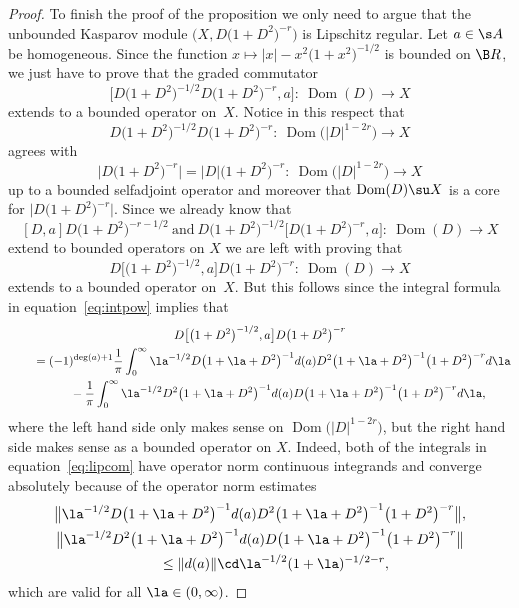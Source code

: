 \begin{proof}
To finish the proof of the proposition we only need to argue that the unbounded Kasparov module $\big(X,D\big(1 + D^2\big)^{-r}\big)$ is Lipschitz regular. Let $a \in \s A$ be homogeneous. Since the function $x \mapsto |x| - x^2 \big(1 + x^2\big)^{-1/2}$ is bounded on $\B R$, we just have to prove that the graded commutator
\[
\big[ D\big(1 + D^2\big)^{-1/2} D\big(1 + D^2\big)^{-r}, a \big]\colon \ \operatorname{Dom}(D) \to X
\]
extends to a bounded operator on~$X$. Notice in this respect that
\[ D\big(1 + D^2\big)^{-1/2} D\big(1 + D^2\big)^{-r}\colon \ \operatorname{Dom}\big(|D|^{1 - 2r}\big) \to X\] agrees with
\[ \big|D\big(1 + D^2\big)^{-r}\big| = |D|\big(1 + D^2\big)^{-r}\colon \ \operatorname{Dom}\big(|D|^{1-2r}\big) \to X\] up to a bounded selfadjoint operator and moreover that $\operatorname{Dom}(D) \su X$ is a core for $\big|D \big(1 + D^2\big)^{-r}\big|$. Since we already know that
\[
[D,a] D \big(1 + D^2\big)^{-r - 1/2} \ \text{and} \ D\big(1 + D^2\big)^{-1/2} \big[D\big(1 + D^2\big)^{-r}, a\big]\colon \ \operatorname{Dom}(D) \to X
\]
extend to bounded operators on $X$ we are left with proving that
\[
D \big[ \big(1 + D^2\big)^{-1/2}, a\big] D\big(1 + D^2\big)^{-r}\colon \ \operatorname{Dom}(D) \to X
\]
extends to a bounded operator on~$X$. But this follows since the integral formula in equation~\eqref{eq:intpow} implies that
\begin{gather}
 D \big[ \big(1 + D^2\big)^{-1/2}, a\big] D\big(1 + D^2\big)^{-r} \nonumber\\
\qquad{} = (-1)^{\deg (a) + 1} \frac{1}{\pi} \int_0^\infty \la^{-1/2} D \big(1 + \la + D^2\big)^{-1} d(a) D^2 \big(1 + \la + D^2\big)^{-1} \big(1 + D^2\big)^{-r} d\la \nonumber\\
\qquad\quad{}-\frac{1}{\pi} \int_0^\infty \la^{-1/2} D^2 \big(1 + \la + D^2\big)^{-1} d(a) D\big(1 + \la + D^2\big)^{-1}\big(1 + D^2\big)^{-r} d\la ,\label{eq:lipcom}
\end{gather}
where the left hand side only makes sense on $\operatorname{Dom}\big(|D|^{1-2r}\big)$, but the right hand side makes sense as a bounded operator on $X$. Indeed, both of the integrals in equation~\eqref{eq:lipcom} have operator norm continuous integrands and converge absolutely because of the operator norm estimates
\begin{gather*}
 \big\| \la^{-1/2} D \big(1 + \la + D^2\big)^{-1} d(a) D^2 \big(1 + \la + D^2\big)^{-1} \big(1 + D^2\big)^{-r} \big\| , \\
 \big\| \la^{-1/2} D^2 \big(1 + \la + D^2\big)^{-1} d(a) D\big(1 + \la + D^2\big)^{-1}\big(1 + D^2\big)^{-r} \big\| \\
 \qquad{} \leq \| d(a) \| \cd \la^{-1/2} (1 + \la)^{-1/2 - r} ,
\end{gather*}
which are valid for all $\la \in (0,\infty)$.
\end{proof}

